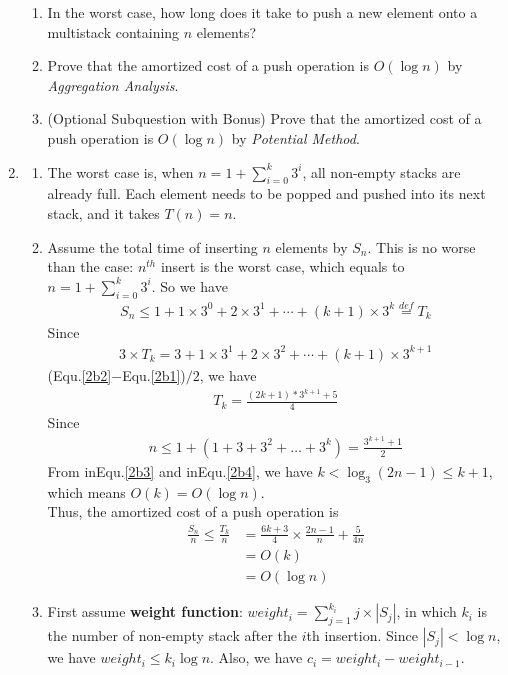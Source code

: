 \documentclass[12pt,a4paper]{article}
\makeatletter
\newtheorem*{solution}{Solution}
\theoremstyle{definition}
\renewenvironment{solution}[1][Solution] {\par\pushQED{\qed}\normalfont\topsep6\p@\@plus6\p@\relax\trivlist\item[\hskip\labelsep\bfseries#1\@addpunct{.}]\ignorespaces}{\popQED\endtrivlist\@endpefalse} \makeatother
\makeatother
\begin{document}
\begin{enumerate}
    \begin{enumerate}
        \item In the worst case, how long does it take to push a new element onto a multistack containing $n$ elements?
        \item Prove that the amortized cost of a push operation is $O(\log n)$ by \emph{Aggregation Analysis}.
        \item {\color{red}(Optional Subquestion with Bonus)} Prove that the amortized cost of a push operation is $O(\log n)$ by \emph{Potential Method}.
    \end{enumerate}

	\begin{solution}
		\begin{enumerate}
			\item The worst case is, when $n=1+\sum_{i=0}^{k}3^i$, all non-empty stacks are already full. Each element needs to be popped and pushed into its next stack, and it takes $T(n)=n$.
			\item 
			Assume the total time of inserting $n$ elements by $S_n$. This is no worse than the case: $n^{th}$ insert is the worst case, which equals to $n=1+\sum_{i=0}^{k}3^i$. So we have
			\begin{align}\label{2b1}
			S_n\leq 1 + 1\times 3^0+2\times 3^1 + \cdots + (k+1)\times 3^k \overset{def}{=} T_k
			\end{align}
			Since
			\begin{align}\label{2b2}
				3\times T_k=3+1\times 3^1+2\times 3^2+\cdots+(k+1)\times 3^{k+1}
			\end{align}
			(Equ.\ref{2b2}$-$Equ.\ref{2b1})$ /2 $, we have
			\begin{align}\label{2b3}
				T_k = \frac{(2k+1)*3^{k+1}+5}{4}
			\end{align}
			Since 
			\begin{align}\label{2b4}
				n\leq 1+(1+3+3^2+\dots+3^k)=\frac{3^{k+1}+1}{2}
			\end{align} 
			From inEqu.\ref{2b3} and inEqu.\ref{2b4}, we have $k<\log_3(2n-1)\le k+1$, which means $ O(k) = O(\log n) $. \\Thus, the amortized cost of a push operation is
			\begin{align*}
			\frac{S_n}{n}\le \frac{T_k}{n}&= \frac{6k+3}{4}\times\frac{2n-1}{n}+\frac{5}{4n}\\
			&=O(k)\\
			&= O(\log n)
			\end{align*}
			$$$$
			\item First assume \textbf{weight function}: $ weight_i = \sum_{j=1}^{k_i}j\times|S_j| $, in which $ k_i $ is the number of non-empty stack after the $i$th insertion. Since $ |S_j| < \log n $, we have $weight_i\leq k_i\log n$. Also, we have $c_i = weight_i - weight_{i-1}$. \\

\end{enumerate}
\end{solution}
\end{enumerate}
\end{document}
